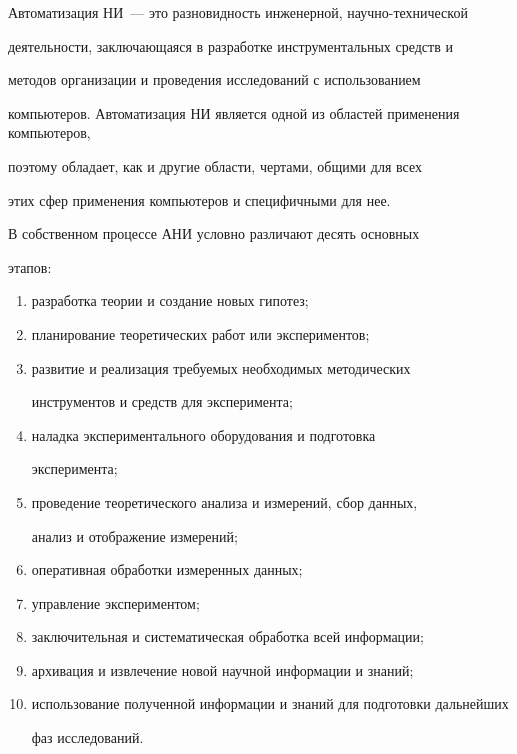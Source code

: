 Автоматизация НИ~--- это разновидность инженерной, на\-уч\-но-тех\-ни\-че\-ской


деятельности, заключающаяся в разработке инструментальных средств и


методов организации и проведения исследований с использованием


компьютеров. Автоматизация НИ является одной из областей применения компьютеров,


поэтому обладает, как и другие области, чертами, общими для всех


этих сфер применения компьютеров и специфичными для нее.


В собственном процессе АНИ условно различают десять основных


этапов:


\begin{enumerate}[(1)]


\item  разработка теории и создание новых гипотез;


\item  планирование теоретических работ или экспериментов;


\item  развитие и реализация требуемых необходимых методических


инструментов и средств для эксперимента;


\item  наладка экспериментального оборудования и подготовка


эксперимента;


\item  проведение теоретического анализа и измерений, сбор данных,


анализ и  отображение измерений;


\item  оперативная обработки измеренных данных;


\item  управление экспериментом;


\item  заключительная и систематическая обработка всей информации;


\pagebreak


\item   архивация и извлечение новой научной информации и знаний;


\item  использование полученной информации и знаний для подготовки дальнейших


фаз исследований.


\end{enumerate}





